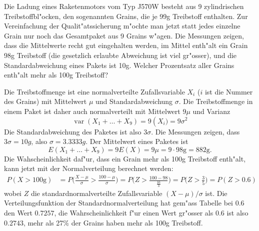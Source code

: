 Die Ladung eines Raketenmotors vom Typ J570W besteht aus 9 zylindrischen
Treibstoffbl"ocken, den sogenannten Grains,
die je 99g Treibstoff enthalten. Zur Vereinfachung der Qualit"atssicherung
m"ochte man jetzt statt jedes einzelne Grain nur noch das Gesamtpaket
aus 9 Grains
w"agen. Die Messungen zeigen, dass die Mittelwerte recht gut eingehalten
werden, im Mittel enth"alt ein Grain 98g Treibstoff (die gesetzlich erlaubte
Abweichung ist viel gr"osser), und die Standardabweichung eines Pakets
ist 10g. Welcher Prozentsatz aller Grains enth"alt mehr als 100g Treibstoff?

\begin{loesung}
Die Treibstoffmenge ist eine normalverteilte Zufallsvariable $X_i$
($i$ ist die Nummer des Grains)
mit Mittelwert $\mu$ und
Standardabweichung $\sigma$. Die Treibstoffmenge in einem
Paket ist daher auch normalverteilt mit Mittelwert $9\mu$ und
Varianz
\[
\operatorname{var}(X_1+\dots+X_9)=9\operatorname(X_i)=9\sigma^2
\]
Die Standardabweichung des Paketes ist also $3\sigma$. Die Messungen
zeigen, dass $3\sigma=10g$, also $\sigma=3.3333g$. Der Mittelwert
eines Paketes ist
\[
E(X_1+\dots+X_9)=9E(X)=9\mu=9\cdot 98\text{g} = 882\text{g}.
\]
Die Wahscheinlichkeit daf"ur, dass ein Grain mehr als 100g Treibstoff
enth"alt, kann jetzt mit der Normalverteilung berechnet werden:
\begin{align*}
P(X>100\text{g})
&=
P\biggl(\frac{X-\mu}{\sigma}>\frac{100-\mu}{\sigma}\biggr)
=
P\biggl(Z>\frac{100-98}{\frac{10}{3}}\biggr)
=
P\biggl(Z>\frac{3}{5}\biggr)
=
P(Z > 0.6)
\end{align*}
wobei $Z$ die standardnormalverteilte Zufallsvariable $(X-\mu)/\sigma$ ist.
Die
Verteilungsfunktion der Standardnormalverteilung hat gem"ass
Tabelle bei $0.6$
den Wert $0.7257$, die Wahrscheinlichkeit f"ur einen Wert gr"osser
als $0.6$ ist also $0.2743$, mehr als 27\% der Grains haben mehr
als 100g Treibstoff.
\end{loesung}


